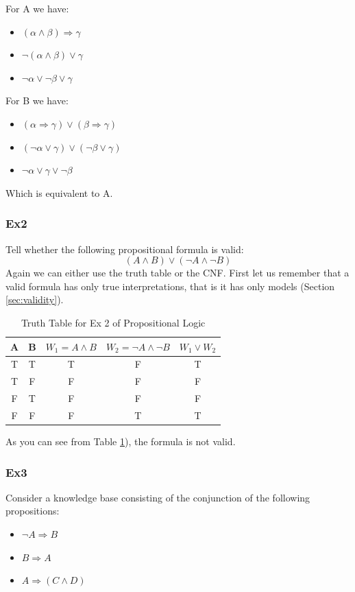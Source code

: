 \documentclass[10pt,a4paper]{article}
\begin{document}
For A we have:
\begin{itemize}
\item $(\alpha \wedge \beta) \Rightarrow \gamma$
\item $\neg (\alpha \wedge \beta) \vee \gamma$
\item $\neg \alpha \vee \neg  \beta \vee \gamma$
\end{itemize}

For B we have:
\begin{itemize}
\item $(\alpha \Rightarrow \gamma) \vee (\beta \Rightarrow \gamma)$
\item $(\neg \alpha \vee \gamma) \vee (\neg \beta \vee \gamma)$
\item $\neg \alpha \vee \gamma \vee \neg \beta$
\end{itemize}
Which is equivalent to A.

\subsubsection{Ex2}
Tell whether the following propositional formula is valid:
\[(A \wedge B) \vee (\neg A \wedge \neg B)\]
Again we can either use the truth table or the CNF. First let us remember that a valid formula has only true interpretations, that is it has only models (Section \ref{sec:validity}).
\begin{table}[H]
    \begin{tabular}{|c|c|c|c|c|}
        \hline
        A & B & $W_1=A \wedge B$ & $W_2= \neg A \wedge \neg B$ & $W_1 \vee W_2$ \\ \hline
        T & T & T              & F                         & T            \\ \hline
        T & F & F              & F                         & F            \\ \hline
        F & T & F              & F                         & F            \\ \hline
        F & F & F              & T                         & T            \\
        \hline
    \end{tabular}
\caption{Truth Table for Ex 2 of Propositional Logic}
\label{tab:prop_logic_ex2}

\end{table}

As you can see from Table \ref{tab:prop_logic_ex2}), the formula is not valid.

\subsubsection{Ex3}
Consider a knowledge base consisting of the conjunction of the
following propositions:
\begin{itemize}
\item $\neg A \Rightarrow B$
\item $ B \Rightarrow A$
\item $ A \Rightarrow (C \wedge D)$
\end{itemize}
\end{document}
